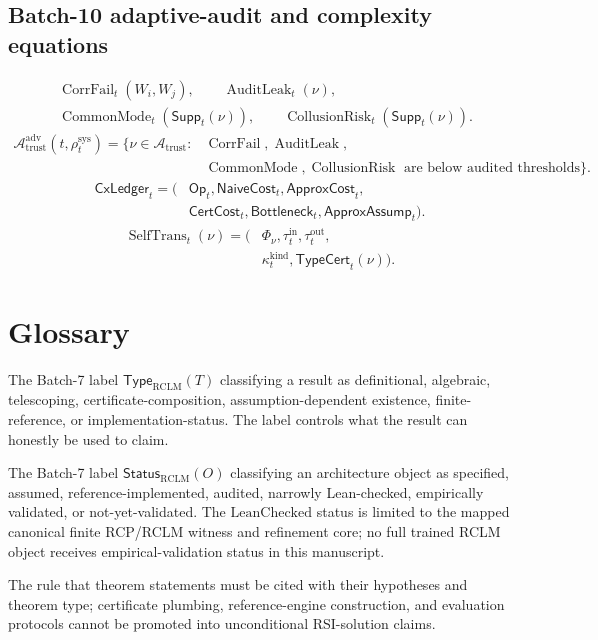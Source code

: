 \documentclass[11pt,a4paper]{article}
\newcommand{\Acal}{\mathcal A}
\newcommand{\adv}{\mathrm{adv}}
\newcommand{\RCLM}{\mathrm{RCLM}}
\newcommand{\sys}{\mathrm{sys}}
\newcommand{\trust}{\mathrm{trust}}
\newcommand{\CorrFail}{\operatorname{CorrFail}}
\newcommand{\AuditLeak}{\operatorname{AuditLeak}}
\newcommand{\CommonMode}{\operatorname{CommonMode}}
\newcommand{\CollusionRisk}{\operatorname{CollusionRisk}}
\newcommand{\SelfTrans}{\operatorname{SelfTrans}}
\begin{document}
\subsection*{Batch-10 adaptive-audit and complexity equations}
\[
\begin{aligned}
&\CorrFail_t(W_i,W_j),\qquad \AuditLeak_t(\nu),\\
&\CommonMode_t(\mathsf{Supp}_t(\nu)),\qquad
\CollusionRisk_t(\mathsf{Supp}_t(\nu)).
\end{aligned}
\]
\[
\begin{aligned}
\Acal_{\trust}^{\adv}(t,\rho_t^{\sys})
=\{\nu\in\Acal_{\trust}:{}&
\CorrFail,\AuditLeak,\\
&\CommonMode,\CollusionRisk
\text{ are below audited thresholds}\}.
\end{aligned}
\]
\[
\begin{aligned}
\mathsf{CxLedger}_t=(
&\mathsf{Op}_t,\mathsf{NaiveCost}_t,\mathsf{ApproxCost}_t,\\
&\mathsf{CertCost}_t,\mathsf{Bottleneck}_t,\mathsf{ApproxAssump}_t).
\end{aligned}
\]
\[
\begin{aligned}
\SelfTrans_t(\nu)=(&\Phi_\nu,\tau_t^{\mathrm{in}},\tau_t^{\mathrm{out}},\\
&\kappa_t^{\mathrm{kind}},\mathsf{TypeCert}_t(\nu)).
\end{aligned}
\]

\section{Glossary}


\begin{description}[leftmargin=2.8cm, style=nextline]
    \item[Theorem type] The Batch-7 label \(\mathsf{Type}_{\RCLM}(T)\) classifying a result as definitional, algebraic, telescoping, certificate-composition, assumption-dependent existence, finite-reference, or implementation-status. The label controls what the result can honestly be used to claim.
    \item[Implementation status] The Batch-7 label \(\mathsf{Status}_{\RCLM}(O)\) classifying an architecture object as specified, assumed, reference-implemented, audited, narrowly Lean-checked, empirically validated, or not-yet-validated. The \(\mathrm{LeanChecked}\) status is limited to the mapped canonical finite RCP/RCLM witness and refinement core; no full trained RCLM object receives empirical-validation status in this manuscript.
    \item[Claim discipline] The rule that theorem statements must be cited with their hypotheses and theorem type; certificate plumbing, reference-engine construction, and evaluation protocols cannot be promoted into unconditional RSI-solution claims.
\end{description}
\end{document}
